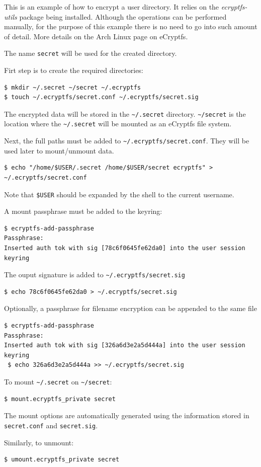 This is an example of how to encrypt a user directory. It relies on the \textit{ecryptfs-utils} package being installed. Although the operations can be performed manually, for the purpose of this example there is no need to go into such amount of detail. More details on the Arch Linux page on eCryptfs\cite{ecryptfs}.

The name \texttt{secret} will be used for the created directory.

Firt step is to create the required directories:
\begin{lstlisting}[numbers=none]
$ mkdir ~/.secret ~/secret ~/.ecryptfs
$ touch ~/.ecryptfs/secret.conf ~/.ecryptfs/secret.sig
\end{lstlisting}

The encrypted data will be stored in the \texttt{\textasciitilde/.secret} directory.
\texttt{\textasciitilde/secret} is the location where the \texttt{\textasciitilde/.secret} will be mounted as an eCryptfs file system.

Next, the full paths must be added to \texttt{\textasciitilde/.ecryptfs/secret.conf}. They will be used later to mount/unmount data.
\begin{lstlisting}[numbers=none]
$ echo "/home/$USER/.secret /home/$USER/secret ecryptfs" > ~/.ecryptfs/secret.conf
\end{lstlisting}
Note that \texttt{\$USER} should be expanded by the shell to the current username.

A mount passphrase must be added to the keyring:
\begin{lstlisting}[numbers=none]
$ ecryptfs-add-passphrase
Passphrase: 
Inserted auth tok with sig [78c6f0645fe62da0] into the user session keyring
\end{lstlisting}

The ouput signature is added to \texttt{\textasciitilde/.ecryptfs/secret.sig}
\begin{lstlisting}[numbers=none]
$ echo 78c6f0645fe62da0 > ~/.ecryptfs/secret.sig
\end{lstlisting}

Optionally, a passphrase for filename encryption can be appended to the same file
\begin{lstlisting}[numbers=none]
$ ecryptfs-add-passphrase
Passphrase: 
Inserted auth tok with sig [326a6d3e2a5d444a] into the user session keyring
 $ echo 326a6d3e2a5d444a >> ~/.ecryptfs/secret.sig
\end{lstlisting}

To mount \texttt{\textasciitilde/.secret} on \texttt{\textasciitilde/secret}:
\begin{lstlisting}[numbers=none]
$ mount.ecryptfs_private secret
\end{lstlisting}
The mount options are automatically generated using the information stored in \texttt{secret.conf} and \texttt{secret.sig}.

Similarly, to unmount:
\begin{lstlisting}[numbers=none]
$ umount.ecryptfs_private secret
\end{lstlisting}
